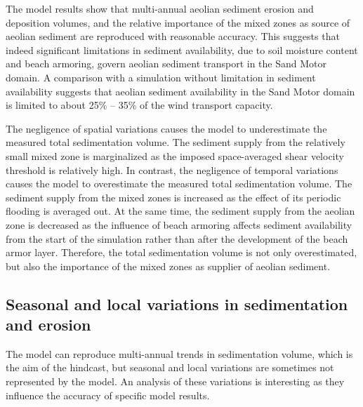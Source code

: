 The model results show that multi-annual aeolian sediment erosion and
deposition volumes, and the relative importance of the mixed zones as
source of aeolian sediment are reproduced with reasonable
accuracy. This suggests that indeed significant limitations in
sediment availability, due to soil moisture content and beach
armoring, govern aeolian sediment transport in the Sand Motor domain.
A comparison with a simulation without limitation in sediment
availability suggests that aeolian sediment availability in the Sand
Motor domain is limited to about 25\% -- 35\% of the wind transport
capacity.

The negligence of spatial variations causes the model to underestimate
the measured total sedimentation volume. The sediment supply from the
relatively small mixed zone is marginalized as the imposed
space-averaged shear velocity threshold is relatively high. In
contrast, the negligence of temporal variations causes the model to
overestimate the measured total sedimentation volume. The sediment
supply from the mixed zones is increased as the effect of its periodic
flooding is averaged out. At the same time, the sediment supply from
the aeolian zone is decreased as the influence of beach armoring
affects sediment availability from the start of the simulation rather
than after the development of the beach armor layer. Therefore, the
total sedimentation volume is not only overestimated, but also the
importance of the mixed zones as supplier of aeolian sediment.

\subsection{Seasonal and local variations in sedimentation and
  erosion}


The model can reproduce multi-annual trends in sedimentation volume,
which is the aim of the hindcast, but seasonal and local variations
are sometimes not represented by the model. An analysis of these
variations is interesting as they influence the accuracy of specific
model results.

